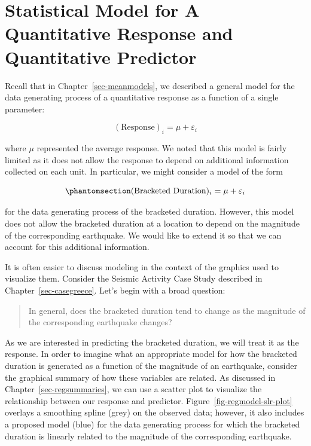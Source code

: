 \documentclass[
  letterpaper,
  DIV=11,
  numbers=noendperiod]{scrreprt}
\theoremstyle{definition}
\theoremstyle{definition}
\theoremstyle{plain}
\theoremstyle{remark}
\begin{document}
\section{Statistical Model for A Quantitative Response and Quantitative
Predictor}\label{statistical-model-for-a-quantitative-response-and-quantitative-predictor}

Recall that in Chapter~\ref{sec-meanmodels}, we described a general
model for the data generating process of a quantitative response as a
function of a single parameter:

\[(\text{Response})_i = \mu + \varepsilon_i\]

where \(\mu\) represented the average response. We noted that this model
is fairly limited as it does not allow the response to depend on
additional information collected on each unit. In particular, we might
consider a model of the form

\begin{equation}\phantomsection\label{eq-regmodel-int-only}{(\text{Bracketed Duration})_i = \mu + \varepsilon_i}\end{equation}

for the data generating process of the bracketed duration. However, this
model does not allow the bracketed duration at a location to depend on
the magnitude of the corresponding earthquake. We would like to extend
it so that we can account for this additional information.

It is often easier to discuss modeling in the context of the graphics
used to visualize them. Consider the Seismic Activity Case Study
described in Chapter~\ref{sec-casegreece}. Let's begin with a broad
question:

\begin{quote}
In general, does the bracketed duration tend to change as the magnitude
of the corresponding earthquake changes?
\end{quote}

As we are interested in predicting the bracketed duration, we will treat
it as the response. In order to imagine what an appropriate model for
how the bracketed duration is generated as a function of the magnitude
of an earthquake, consider the graphical summary of how these variables
are related. As discussed in Chapter~\ref{sec-regsummaries}, we can use
a scatter plot to visualize the relationship between our response and
predictor. Figure~\ref{fig-regmodel-slr-plot} overlays a smoothing
spline (grey) on the observed data; however, it also includes a proposed
model (blue) for the data generating process for which the bracketed
duration is linearly related to the magnitude of the corresponding
earthquake.
\end{document}
